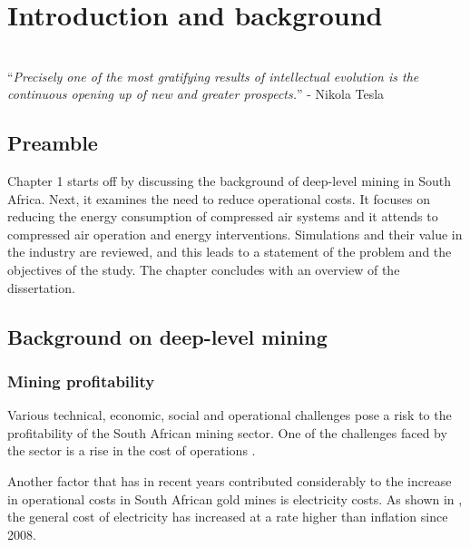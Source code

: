\chapter{Introduction and background}  %
\thispagestyle{empty}
\vspace{40em}
\hrulefill
\\
\enquote{\textit{Precisely one of the most gratifying results of intellectual evolution is the continuous opening up of new and greater prospects.}} -  Nikola Tesla\\
\newpage

\section{Preamble}
Chapter 1 starts off by discussing the background of deep-level mining in South Africa. Next, it examines the need to reduce operational costs. It focuses on reducing the energy consumption of compressed air systems and it attends to compressed air operation and energy interventions. Simulations and their value in the industry are reviewed, and this leads to a statement of the problem and the objectives of the study. The chapter concludes with an overview of the dissertation.
\section{Background on deep-level mining}
	\subsection{Mining profitability}
	
	 	Various technical, economic, social and operational challenges pose a risk to the profitability of the South African mining sector. One of the challenges faced by the sector is a rise in the cost of operations \cite{neingo2016trends}.
	 	\par
	 	
		Another factor that has in recent years contributed considerably to the increase in operational costs in South African gold mines is electricity costs. As shown in , the general cost of electricity has increased at a rate higher than inflation since 2008\footnotemark[1].
		
